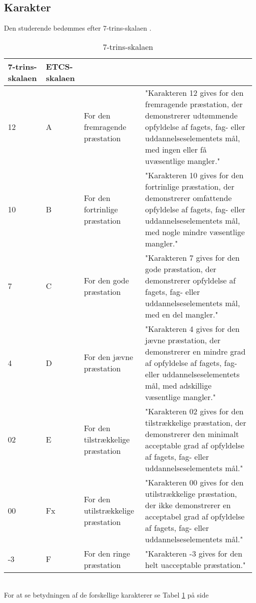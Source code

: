 \documentclass[a4paper]{article}
\begin{document}
\subsection{Karakter}
Den studerende bedømmes efter 7-trins-skalaen \cite[§ 1]{karakter}.
\begin{table}[!t]
\centering
\begin{tabular}{|p{}|p{}|p{}|p{}|}\hline
7-trins-skalaen&ETCS-skalaen&&\\\hline
12&A&For den fremragende præstation&"Karakteren 12 gives for den fremragende præstation, der demonstrerer udtømmende opfyldelse af fagets, fag- eller uddannelseselementets mål, med ingen eller få uvæsentlige mangler." \cite[§ 2]{karakter}\\\hline
10&B&For den fortrinlige præstation&"Karakteren 10 gives for den fortrinlige præstation, der demonstrerer omfattende opfyldelse af fagets, fag- eller uddannelseselementets mål, med nogle mindre væsentlige mangler." \cite[§ 3]{karakter}\\\hline
7&C&For den gode præstation&"Karakteren 7 gives for den gode præstation, der demonstrerer opfyldelse af fagets, fag- eller uddannelseselementets mål, med en del mangler." \cite[§ 4]{karakter}\\\hline
4&D&For den jævne præstation&"Karakteren 4 gives for den jævne præstation, der demonstrerer en mindre grad af opfyldelse af fagets, fag- eller uddannelseselementets mål, med adskillige væsentlige mangler." \cite[§ 5]{karakter}\\\hline
02&E&For den tilstrækkelige præstation&"Karakteren 02 gives for den tilstrækkelige præstation, der demonstrerer den minimalt acceptable grad af opfyldelse af fagets, fag- eller uddannelseselementets mål." \cite[§ 6]{karakter}\\\hline
00&Fx&For den utilstrækkelige præstation&"Karakteren 00 gives for den utilstrækkelige præstation, der ikke demonstrerer en acceptabel grad af opfyldelse af fagets, fag- eller uddannelseselementets mål." \cite[§ 7]{karakter}\\\hline
-3&F&For den ringe præstation&"Karakteren -3 gives for den helt uacceptable præstation." \cite[§ 8]{karakter}\\\hline
\end{tabular}
\caption{7-trins-skalaen}\label{tab:7-trins-skalaen}
\end{table}
\\For at se betydningen af de forskellige karakterer se Tabel \ref{tab:7-trins-skalaen} på side \pageref{tab:7-trins-skalaen}

\listoffigures
\listoftables

\end{document}
